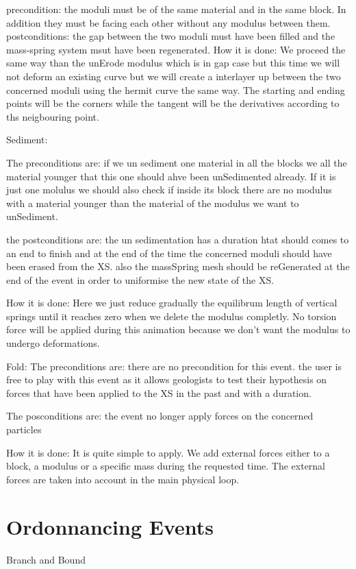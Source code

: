 \documentclass[12pt, a4paper]{memoir} %
\begin{document}
		precondition: the moduli must be of the same material and in the same block. In addition they must be facing each other without any modulus between them. 
		postconditions: the gap between the two moduli must have been filled and the mass-spring system msut have been regenerated.
		How it is done: We proceed the same way than the unErode modulus which is in gap case but this time we will not deform an existing curve but we will create a interlayer up between the two concerned moduli using the hermit curve the same way. The starting and ending points will be the corners while the tangent will be the derivatives according to ths neigbouring point.
		

Sediment:

	The preconditions are: if we un sediment one material in all the blocks
	we all the material younger that this one should ahve been unSedimented already. If it is just one molulus we should also check if inside its block there are  no modulus with a material younger than the material of the modulus we want to unSediment.
	
	the postconditions are: the un sedimentation has a duration htat should comes to an end to finish and at the end of the time the concerned moduli should have been erased from the XS. also the massSpring mesh should be reGenerated at the end of the event in order to uniformise the new state of the XS.
	
	How it is done: Here we just reduce gradually the equilibrum length of vertical springs until it reaches zero when we delete the modulus completly. No torsion force will be applied during this animation because we don't want the modulus to undergo deformations.

Fold:
	The preconditions are: there are no precondition for this event. the user is free to play with this event as it allows geologists to test their hypothesis on forces that have been applied to the XS in the past and with a duration.
	
	The posconditions are: the event no longer apply forces on the concerned particles
	
	How it is done: It is quite simple to apply. We add external forces either to a block, a modulus or a specific mass during the requested time. The external forces are taken into account in the main physical loop.
	

\section{Ordonnancing Events}
Branch and Bound
\end{document}
